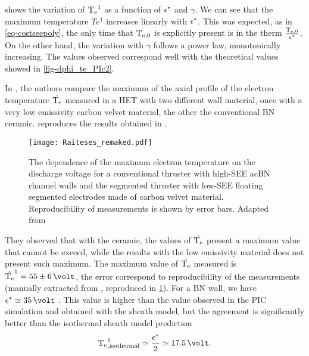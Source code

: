      shows the variation of $\mathrm{T_e}^1$ as a function of   $\epsilon^{*}$  and $\gamma$.
    We can see that the maximum temperature $Te^1$ increases linearly with $\epsilon^{*}$.
    This was expected, as in \cref{eq-costseepoly}, the only time that $\mathrm{T_{e, 0}}$ is explicitly present is in the therm $\frac{\mathrm{T_{e, 0}}}{\epsilon^{*}}$.
    On the other hand, the variation with $\gamma$ follows a power law, monotonically increasing.
    The values observed correspond well with the theoretical values showed in \cref{fig-dphi_te_PIc2}.
    
    In \citet{raitses2006}, the authors compare the maximum of the axial profile of the electron temperature $\hat{\mathrm{T_e}}$ measured in a \ac{HET} with two different wall material, once with a very low emissivity carbon velvet material, the other the conventional \ac{BN} ceramic.
     reproduces the results obtained in \citet{raitses2006}.
    
    \begin{figure}[hbtp]
      \centering
      \texttt{[image: Raiteses\_remaked.pdf]}
      \caption{ The dependence of the maximum electron temperature on the discharge  voltage for a conventional thruster with high-SEE ac{BN} channel walls and the segmented thruster with low-SEE floating segmented electrodes made of carbon velvet material. Reproducibility of measurements is shown by error bars. Adapted from \citet[Fig. 3]{raitses2006} }
      \label{fig-raiteses2006}
    \end{figure}
    
    
    They observed that with the ceramic, the values of $\hat{\mathrm{T_e}}$ present a maximum value that cannot be exceed, while the results with the low emissivity material does not present such maximum.
    The maximum value of $\hat{\mathrm{T_e}}$ measured is $\hat{\Te}^1 = 55 \pm 6\,\volt$, the error correspond to reproducibility of the measurements (manually extracted from \citep[Fig. 3]{raitses2006}, reproduced in \cref{fig-raiteses2006}).
    For a \ac{BN} wall, we have $\crover\simeq 35\,\volt$ \citet{smirnov2004}.
    This value is higher than the value observed in the \ac{PIC} simulation and obtained with the sheath model, but the agreement is significantly better than the isothermal sheath model prediction 
    \begin{equation} \label{eq-Temaxisothermal}
      \Te^1_{\rm , isothermal} \simeq \frac{\crover}{2} \simeq 17.5 \,\volt.
    \end{equation}
    
